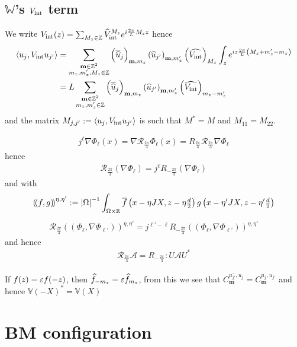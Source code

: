 \documentclass[11pt,a4paper,reqno,french,tikz]{amsart}
\newcommand\cA{\mathcal{A}}\newcommand\cB{\mathcal{B}}\newcommand\cC{\mathcal{C}}\newcommand\cD{\mathcal{D}}\newcommand\cE{\mathcal{E}}\newcommand\cF{\mathcal{F}}\newcommand\cG{\mathcal{G}}\newcommand\cH{\mathcal{H}}\newcommand\cI{\mathcal{I}}\newcommand\cJ{\mathcal{J}}\newcommand\cK{\mathcal{K}}\newcommand\cL{\mathcal{L}}\newcommand\cM{\mathcal{M}}\newcommand\cN{\mathcal{N}}\newcommand\cO{\mathcal{O}}\newcommand\cP{\mathcal{P}}\newcommand\cQ{\mathcal{Q}}\newcommand\cR{\mathcal{R}}\newcommand\cS{\mathcal{S}}\newcommand\cT{\mathcal{T}}\newcommand\cU{\mathcal{U}}\newcommand\cV{\mathcal{V}}\newcommand\cW{\mathcal{W}}\newcommand\cX{\mathcal{X}}\newcommand\cY{\mathcal{Y}}\newcommand\cZ{\mathcal{Z}}
\newcommand{\pa}[1]{\left( #1 \right)} %
\newcommand{\ab}[1]{\left|#1\right|} %
\newcommand{\ps}[1]{\left< #1 \right>} %
\newcommand{\na}{\nabla} %
\newcommand{\f}[2]{\frac{#1}{#2}} %
\newcommand{\ind}[1]{_{\textup{#1}}} %
\newcommand{\bbV}{\mathbb{V}}
\newcommand{\db}[1]{\left(\!\left( #1 \right)\!\right)}
\def\bmm{{\mathbf m}}
\def\bbV{{\mathbb V}}
\def\bbW{{\mathbb W}}
\newcommand{\dd}{\tfrac{d}{2}}
\begin{document}
\subsection{$\bbW$'s $V\ind{int}$ term}%
\label{sub:_bbw_s_vint_term}
We write $V\ind{int}(z) = \sum_{M_z \in \Z} \widehat{V}\ind{int}^{M_z} e^{i \f{2\pi}L M_z z}$ hence
\begin{align*}
	\ps{u_j, V\ind{int} u_{j'}} &= \sum_{\substack{\bmm \in \Z^2 \\ m_z,m_z',M_z \in \Z}} \pa{\overline{\widehat{u}}_j}_{\bmm,m_z} \pa{\widehat{u}_{j'}}_{\bmm,m_z'}\pa{\widehat{V\ind{int}}}_{M_z} \int_z e^{iz \f{2\pi}{L} \pa{M_z + m_z'-m_z}} \\
& = L \sum_{\substack{\bmm \in \Z^2 \\ m_z,m_z' \in \Z}} \pa{\overline{\widehat{u}}_j}_{\bmm,m_z} \pa{\widehat{u}_{j'}}_{\bmm,m_z'}\pa{\widehat{V\ind{int}}}_{m_z-m_z'} 
\end{align*}
and the matrix $M_{j,j'} := \ps{u_j, V\ind{int} u_{j'}}$ is such that $M^* = M$ and $M_{11} = M_{22}$.


\begin{align*}
j^{\ell} \na \Phi_\ell(x) = \na \cR_{\f{2\pi}3} \Phi_\ell(x) = R_{\f{2\pi}3} \cR_{\f{2\pi}3} \na \Phi_\ell
\end{align*}
hence
\begin{align*}
\cR_{\f{2\pi}3} \pa{\na \Phi_\ell} = j^\ell R_{-\f{2\pi}3} \pa{\na \Phi_\ell}
\end{align*}
and with
\begin{align*}
\db{f,g}^{\eta,\eta'} := \ab{\Omega}^{-1} \int_{\Omega\times\R} \overline{f}\pa{x-\eta JX,z - \eta \dd} g\pa{x-\eta'JX,z-\eta'\dd}
\end{align*}
\begin{align*}
\cR_{\f{2\pi}3} \db{ \Phi_\ell,\na \Phi_{\ell'} }^{\eta,\eta'} = j^{\ell'-\ell}R_{-\f{2\pi}3} \db{  \Phi_\ell,\na \Phi_{\ell'}}^{\eta,\eta'}
\end{align*}
and hence
\begin{align*}
\cR_{\f{2\pi}3} \bm{\cA} = R_{-\f{2\pi}3} : U \bm{\cA} U^*
\end{align*}

If $f(z) = \varepsilon f(-z)$, then $\widehat{f}_{-m_z} = \varepsilon \widehat{f}_{m_z}$, from this we see that $\overline{C_\bmm^{u_{j'},u_{j}}} = C_\bmm^{u_{j},u_{j'}}$ and hence $\bbV(-X)^* = \bbV(X)$







\section{BM configuration}%
\label{sec:bm_configuration}
\end{document}
